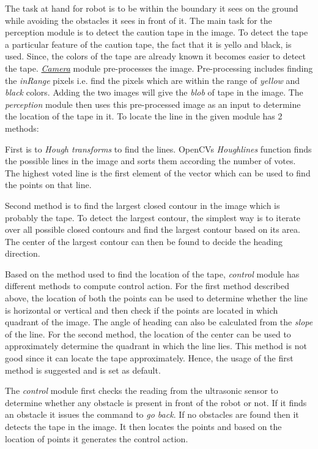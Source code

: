 The task at hand for robot is to be within the boundary it sees on the ground while avoiding the obstacles it sees in front of it. The main task for the perception module is to detect the caution tape in the image. To detect the tape a particular feature of the caution tape, the fact that it is yello and black, is used. Since, the colors of the tape are already known it becomes easier to detect the tape. {\itshape \hyperlink{class_camera}{Camera}} module pre-\/processes the image. Pre-\/processing includes finding the {\itshape in\+Range} pixels i.\+e. find the pixels which are within the range of {\itshape yellow} and {\itshape black} colors. Adding the two images will give the {\itshape blob} of tape in the image. The {\itshape perception} module then uses this pre-\/processed image as an input to determine the location of the tape in it. To locate the line in the given module has 2 methods\+:


\begin{DoxyItemize}
\item First is to {\itshape Hough transforms} to find the lines. Open\+CV\textquotesingle{}s {\itshape Houghlines} function finds the possible lines in the image and sorts them according the number of votes. The highest voted line is the first element of the vector which can be used to find the points on that line.
\item Second method is to find the largest closed contour in the image which is probably the tape. To detect the largest contour, the simplest way is to iterate over all possible closed contours and find the largest contour based on its area. The center of the largest contour can then be found to decide the heading direction.
\end{DoxyItemize}

Based on the method used to find the location of the tape, {\itshape control} module has different methods to compute control action. For the first method described above, the location of both the points can be used to determine whether the line is horizontal or vertical and then check if the points are located in which quadrant of the image. The angle of heading can also be calculated from the {\itshape slope} of the line. For the second method, the location of the center can be used to approximately determine the quadrant in which the line lies. This method is not good since it can locate the tape approximately. Hence, the usage of the first method is suggested and is set as default.

The {\itshape control} module first checks the reading from the ultrasonic sensor to determine whether any obstacle is present in front of the robot or not. If it finds an obstacle it issues the command to {\itshape go back}. If no obstacles are found then it detects the tape in the image. It then locates the points and based on the location of points it generates the control action.


